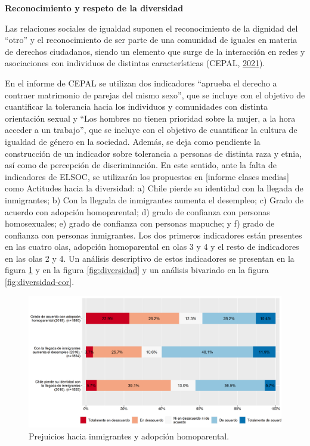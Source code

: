 \documentclass[
  12pt,
]{book}
\begin{document}
\textbf{Reconocimiento y respeto de la diversidad}

Las relaciones sociales de igualdad suponen el reconocimiento de la dignidad del ``otro'' y el reconocimiento de ser parte de una comunidad de iguales en materia de derechos ciudadanos, siendo un elemento que surge de la interacción en redes y asociaciones con individuos de distintas características (CEPAL, \protect\hyperlink{ref-cepal_Cohesion_2021}{2021}).

En el informe de CEPAL se utilizan dos indicadores ``aprueba el derecho a contraer matrimonio de parejas del mismo sexo'', que se incluye con el objetivo de cuantificar la tolerancia hacia los individuos y comunidades con distinta orientación sexual y ``Los hombres no tienen prioridad sobre la mujer, a la hora acceder a un trabajo'', que se incluye con el objetivo de cuantificar la cultura de igualdad de género en la sociedad. Además, se deja como pendiente la construcción de un indicador sobre tolerancia a personas de distinta raza y etnia, así como de percepción de discriminación. En este sentido, ante la falta de indicadores de ELSOC, se utilizarán los propuestos en {[}informe clases medias{]} como Actitudes hacia la diversidad: a) Chile pierde su identidad con la llegada de inmigrantes; b) Con la llegada de inmigrantes aumenta el desempleo; c) Grado de acuerdo con adopción homoparental; d) grado de confianza con personas homosexuales; e) grado de confianza con personas mapuche; y f) grado de confianza con personas inmigrantes. Los dos primeros indicadores están presentes en las cuatro olas, adopción homoparental en olas 3 y 4 y el resto de indicadores en las olas 2 y 4. Un análisis descriptivo de estos indicadores se presentan en la figura \ref{fig:prejuicios} y en la figura \ref{fig:diversidad} y un análisis bivariado en la figura \ref{fig:diversidad-cor}.

\begin{figure}[H]

{\centering \includegraphics[width=1\linewidth,height=1\textheight]{output/graphs/prejuicios} 

}

\caption{Prejuicios hacia inmigrantes y adopción homoparental.}\label{fig:prejuicios}
\end{figure}
\end{document}
